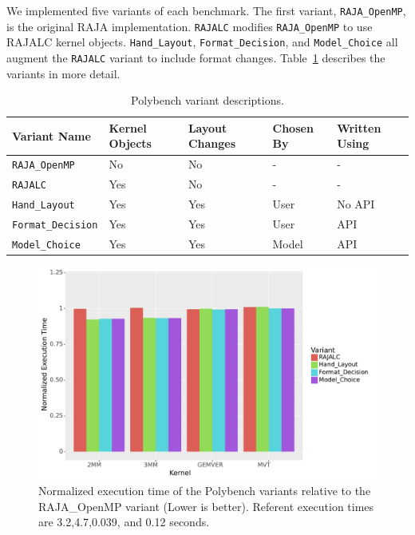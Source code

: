 \documentclass[sigconf]{acmart}
\begin{document}
We implemented five variants of each benchmark.
The first variant, \verb.RAJA_OpenMP., is the original RAJA implementation.
\verb.RAJALC. modifies \verb.RAJA_OpenMP. to use RAJALC kernel objects.
\verb.Hand_Layout., \verb.Format_Decision., and \verb.Model_Choice. all augment the \verb.RAJALC. variant to include format changes.
Table~\ref{VariantDescription} describes the variants in more detail.

\begin{table}
	\centering
	\begin{tabular}{ p{2.4cm} | p{1.1cm} | p{1.1cm} | p{1cm} | p{1cm}}
		 \raggedright Variant \linebreak Name & \raggedright Kernel Objects & \raggedright Layout Changes & \raggedright Chosen By &  Written Using \tabularnewline
		\hline
		\verb.RAJA_OpenMP. & No & No & - & - \\
		\verb.RAJALC. & Yes & No & - & - \\
		\verb.Hand_Layout. & Yes & Yes & User & No API \\
		\verb.Format_Decision. & Yes & Yes & User & API \\
		\verb.Model_Choice. & Yes & Yes & Model & API
	\end{tabular}
	\caption{Polybench variant descriptions.}
	\label{VariantDescription}
\end{table}

\begin{figure}
	\includegraphics[width=\columnwidth]{PolybenchPerfPlot.pdf}
	\caption{Normalized execution time of the Polybench variants relative to the RAJA\_OpenMP variant (Lower is better). Referent execution times are 3.2,4.7,0.039, and 0.12 seconds.}
	\label{PolybenchPerformance}
\end{figure}
\end{document}
